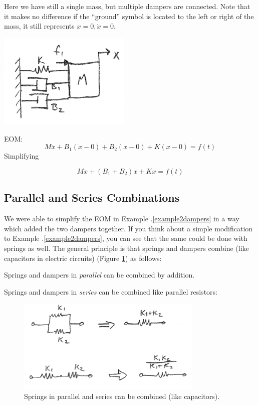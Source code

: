 \begin{ExampleSmall}\label{example2dampers}
Here we have still a single mass, but multiple dampers are connected.   Note that it makes no difference if the ``ground'' symbol is located to the left or right of the mass, it still represents $x=0, \dot{x}=0$.



\includegraphics[width=2.5in]{figs02/00722a.png}


EOM:
\[
M\ddot{x} + B_1(\dot{x}-0)+B_2(\dot{x}-0)+K(x-0) = f(t)
\]
Simplifying

\[
M\ddot{x} + (B_1+B_2)\dot{x}+Kx = f(t)
\]
\end{ExampleSmall}


\subsection{Parallel and Series Combinations}
We were able to simplify the EOM in Example \thechapter.\ref{example2dampers} in a way which added the two dampers together.   If you think about a simple modification to Example \thechapter.\ref{example2dampers}, you can see that the same could be done with springs as well.
The general principle is that springs and dampers combine (like capacitors in electric circuits) (Figure \ref{seriessprings}) as follows:

Springs and dampers in {\it parallel} can be combined by addition.

Springs and dampers in {\it series}   can be combined like parallel resistors:

\begin{figure}[h]\centering
\includegraphics[width=3.5in]{figs02/00723a.png}
\caption{Springs in parallel and series can be combined (like capacitors).}\label{seriessprings}
\end{figure}



